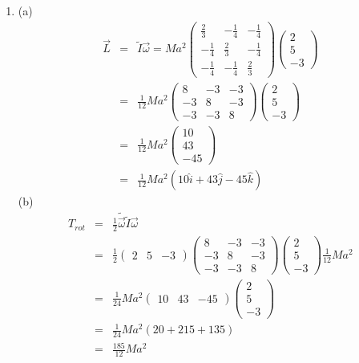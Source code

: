 \documentclass[a4paper,11pt,fleqn]{article}
\newcommand{\n}{\newline}
\begin{document}
\begin{enumerate}[start=12]
\newpage
\item
(a) \n\n
\begin{eqnarray*}
	\vec{L} &=& \tilde{I} \vec{\omega} = Ma^2 \begin{pmatrix}
		\frac{2}{3} & -\frac{1}{4} & -\frac{1}{4} \\
		-\frac{1}{4} & \frac{2}{3} & -\frac{1}{4} \\
		-\frac{1}{4} & -\frac{1}{4} & \frac{2}{3}
	\end{pmatrix} \begin{pmatrix}
	2 \\ 5 \\ -3 \end{pmatrix} \\
	&=& \frac{1}{12} M a^2 \begin{pmatrix}
		8 & -3 & -3 \\
		-3 & 8 & -3 \\
		-3 & -3 & 8 \end{pmatrix} \begin{pmatrix}
		2 \\ 5 \\ -3
	\end{pmatrix} \\
	&=& \frac{1}{12} M a^2 \begin{pmatrix}
		10 \\ 43 \\ -45
	\end{pmatrix} \\
	&=& \frac{1}{12} M a^2 ( 10 \hat{i} + 43 \hat{j} -45 \hat{k})
\end{eqnarray*}
\n
(b) \n\n
\begin{eqnarray*}
	T_{rot} &=& \frac{1}{2} \tilde{\vec{\omega}} \tilde{I} \vec{\omega} \\
	&=& \frac{1}{2} \begin{pmatrix}
		2 & 5 & -3
	\end{pmatrix} \begin{pmatrix}
	8 & -3 & -3 \\
	-3 & 8 & -3 \\
	-3 & -3 & 8 \end{pmatrix} \begin{pmatrix}
	2\\5\\-3
	\end{pmatrix} \frac{1}{12} M a^2 \\
	&=& \frac{1}{24} M a^2 \begin{pmatrix}
		10 & 43 & -45
	\end{pmatrix} \begin{pmatrix}
	2\\5\\-3 \end{pmatrix} \\
	&=& \frac{1}{24} M a^2 ( 20 + 215 + 135) \\
	&=& \frac{185}{12} M a^2
\end{eqnarray*}
\n\n\n\n\n\n\n\n



\end{enumerate}
\end{document}
